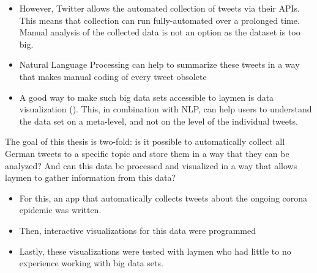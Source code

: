 \begin{itemize}
    \item However, Twitter allows the automated collection of tweets via their APIs. This means that collection can run fully-automated over a prolonged time. Manual analysis of the collected data is not an option as the dataset is too big.
    \item Natural Language Processing can help to summarize these tweets in a way that makes manual coding of every tweet obsolete
    \item A good way to make such big data sets accessible to laymen is data visualization (\cite{donalekImmersiveCollaborativeData2014}). This, in combination with NLP, can help users to understand the data set on a meta-level, and not on the level of the individual tweets.
\end{itemize}

The goal of this thesis is two-fold: is it possible to automatically collect all German tweets to a specific topic and store them in a way that they can be analyzed? And can this data be processed and visualized in a way that allows laymen to gather information from this data?

\begin{itemize}
    \item For this, an app that automatically collects tweets about the ongoing corona epidemic was written.
    \item Then, interactive visualizations for this data were programmed
    \item Lastly, these visualizations were tested with laymen who had little to no experience working with big data sets.
\end{itemize}